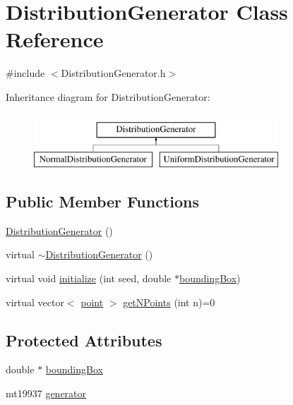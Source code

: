 \hypertarget{class_distribution_generator}{}\section{Distribution\+Generator Class Reference}
\label{class_distribution_generator}


{\ttfamily \#include $<$Distribution\+Generator.\+h$>$}

Inheritance diagram for Distribution\+Generator\+:\begin{figure}[H]
\begin{center}
\leavevmode
\includegraphics[height=2.000000cm]{dc/dc8/class_distribution_generator}
\end{center}
\end{figure}
\subsection*{Public Member Functions}
\begin{DoxyCompactItemize}
\item 
\hyperlink{class_distribution_generator_a9ade678342c897fddf74da6a453cfa7b}{Distribution\+Generator} ()
\item 
virtual \hyperlink{class_distribution_generator_ada1c1b4e9024716e3041ee7836deff65}{$\sim$\+Distribution\+Generator} ()
\item 
virtual void \hyperlink{class_distribution_generator_ae4fa2d599942539e4b1971b0a8d5f8ba}{initialize} (int seed, double $\ast$\hyperlink{class_distribution_generator_abbb670b1d48a4820559097b85bf6ee2d}{bounding\+Box})
\item 
virtual vector$<$ \hyperlink{structpoint}{point} $>$ \hyperlink{class_distribution_generator_a777dcdfd3dee93cfcbcc00969f42ca29}{get\+N\+Points} (int n)=0
\end{DoxyCompactItemize}
\subsection*{Protected Attributes}
\begin{DoxyCompactItemize}
\item 
double $\ast$ \hyperlink{class_distribution_generator_abbb670b1d48a4820559097b85bf6ee2d}{bounding\+Box}
\item 
mt19937 \hyperlink{class_distribution_generator_a875697de8d5c0a4d18e473e483a9646c}{generator}
\end{DoxyCompactItemize}


